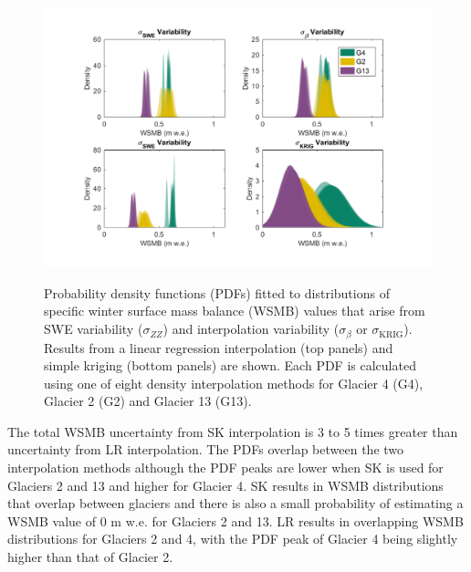 \documentclass[12pt]{article}
\begin{document}
\begin{figure}
	\centering
\hspace*{-1.2cm}
	\includegraphics[width =1.2\textwidth]{WSMBDist_LR.pdf}\\
	\caption{Probability density functions (PDFs) fitted to distributions of specific winter surface mass balance (WSMB) values that arise from SWE variability ($\sigma_{ZZ}$) and interpolation variability ($\sigma_{\beta}$ or $\sigma_{\mathrm{KRIG}}$). Results from a linear regression interpolation (top panels) and simple kriging (bottom panels) are shown. Each PDF is calculated using one of eight density interpolation methods for Glacier 4 (G4), Glacier 2 (G2) and Glacier 13 (G13).}
	\label{fig:WSMBDist_LR}
\end{figure}

The total WSMB uncertainty from SK interpolation is 3 to 5 times greater than uncertainty from LR interpolation. The PDFs overlap between the two interpolation methods although the PDF peaks are lower when SK is used for Glaciers 2 and 13 and higher for Glacier 4. SK results in WSMB distributions that overlap between glaciers and there is also a small probability of estimating a WSMB value of 0 m w.e. for Glaciers 2 and 13. LR results in overlapping WSMB distributions for Glaciers 2 and 4, with the PDF peak of Glacier 4 being slightly higher than that of Glacier 2. 
\end{document}
